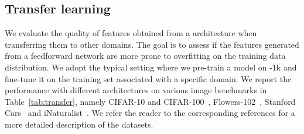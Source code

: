 \subsection{Transfer learning} 
We evaluate the quality of features obtained from a \OURS architecture when transferring them to other domains. The goal is to assess if the features generated from a feedforward network are more prone to overfitting on the training data distribution.
We adopt the typical setting where we pre-train a model on \ImNet-1k and fine-tune it on the training set associated with a specific domain. We report the performance with different architectures on various image benchmarks in Table~\ref{tab:transfer}, namely CIFAR-10 and CIFAR-100~\cite{krizhevsky2009learning}, Flowers-102~\cite{Nilsback08}, Stanford Cars~\cite{Cars2013} and iNaturalist~\cite{Horn2019INaturalist}.  
We refer the reader to the corresponding references for a more detailed description of the  datasets.

